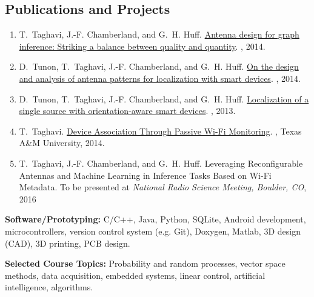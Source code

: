 \subsection*{Publications and Projects}

\begin{enumerate}    \itemsep0pt

\item T.~Taghavi, J.-F. Chamberland, and G.~H. Huff.
\newblock \href{http://dx.doi.org/10.1109/USNC-URSI-NRSM.2014.6927995}{Antenna design for graph inference: Striking a balance between quality and quantity}.
, 2014.

\item D.~Tunon, T.~Taghavi, J.-F. Chamberland, and G.~H. Huff.
\newblock \href{http://dx.doi.org/10.1109/USNC-URSI-NRSM.2014.6928007}{On the design and analysis of antenna patterns for localization with smart devices}.
, 2014.

\item D.~Tunon, T.~Taghavi, J.-F. Chamberland, and G.~H. Huff.
\newblock \href{http://dx.doi.org/10.1109/GlobalSIP.2013.6736829}{Localization of a single source with orientation-aware smart devices}.
, 2013.

\item T.~Taghavi.
\newblock \href{http://hdl.handle.net/1969.1/152045}{Device Association Through Passive Wi-Fi Monitoring}.
, Texas A\&M University, 2014.

\item T.~Taghavi, J.-F. Chamberland, and G.~H. Huff.
\newblock Leveraging Reconfigurable Antennas and Machine Learning in Inference Tasks Based on Wi-Fi Metadata.
\newblock To be presented at {\em National Radio Science Meeting, Boulder, CO}, 2016
\end{enumerate}

\textbf{Software/Prototyping:} C/C++, Java, Python, SQLite,
Android development, microcontrollers,
version control system (e.g. Git), Doxygen, Matlab,
3D design (CAD), 3D printing, PCB design.

\textbf{Selected Course Topics:} Probability and random processes, vector space methods, data acquisition, embedded systems, linear control, artificial intelligence, algorithms.

